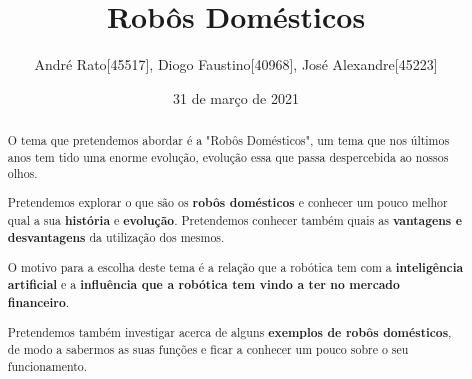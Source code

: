 \documentclass{article}
\title{Robôs Domésticos}
\author{André Rato[45517], Diogo Faustino[40968], José Alexandre[45223]}
\date{31 de março de 2021}
\begin{document}
\maketitle

\renewcommand\abstractname{Resumo}
\begin{abstract}

O tema que pretendemos abordar é a "Robôs Domésticos", um tema que nos últimos anos tem tido uma enorme evolução, evolução essa que passa despercebida ao nossos olhos.\par
Pretendemos explorar o que são os \textbf{robôs domésticos}\cite{whatare} e conhecer um pouco melhor qual a sua \textbf{história} e \textbf{evolução}\cite{history}. Pretendemos conhecer também quais as \textbf{vantagens e desvantagens}\cite{advantages} da utilização dos mesmos.\par
O motivo para a escolha deste tema é a relação que a robótica tem com a \textbf{inteligência artificial}\cite{airobots} e a \textbf{influência que a robótica tem vindo a ter no mercado financeiro}\cite{market}.\par
Pretendemos também investigar acerca de alguns \textbf{exemplos de robôs domésticos}\cite{examples}, de modo a sabermos as suas funções e ficar a conhecer um pouco sobre o seu funcionamento.

\end{abstract}

\printbibliography[title=Referências]
\end{document}
